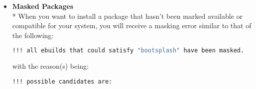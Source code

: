 \documentclass[11pt]{article}
\begin{document}
\begin{itemize}
      \item \textbf{Masked Packages}
       \\* When you want to install a package that hasn't been marked available or compatible for your system, you will receive a masking error similar to that of the following:
       \begin{lstlisting}[basicstyle=\ttfamily, backgroundcolor = \color{lightgray}, language = bash, xleftmargin = 0cm, framexleftmargin = 1em, framexrightmargin = 5em, showstringspaces=false]
!!! all ebuilds that could satisfy "bootsplash" have been masked. 
\end{lstlisting}
       with the reason(s) being:
       \begin{lstlisting}[basicstyle=\ttfamily, backgroundcolor = \color{lightgray}, language = bash, xleftmargin = 0cm, framexleftmargin = 1em, framexrightmargin = 2em, showstringspaces=false]
!!! possible candidates are:


\end{lstlisting}
\end{itemize}
\end{document}
